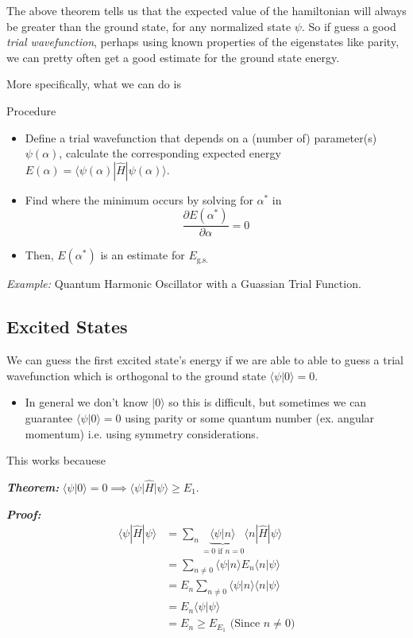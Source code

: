 \documentclass{article}
\newcommand{\ket}[1]{|#1 \rangle}
\newcommand{\inner}[2]{\langle #1 | #2 \rangle}
\begin{document}
\vskip 0.5cm
The above theorem tells us that the expected value of the hamiltonian will always be greater than the ground state, for any normalized state $\psi$. So if guess a good \emph{trial wavefunction}, perhaps using known properties of the eigenstates like parity, we can pretty often get a good estimate for the ground state energy. 

\vskip 0.5cm
More specifically, what we can do is 
\begin{mathdefinitionbox}{Procedure}
  \begin{itemize}
    \item Define a trial wavefunction that depends on a (number of) parameter(s) $\psi(\alpha)$, calculate the corresponding expected energy $E(\alpha) = \inner{\psi(\alpha)}{\hat{H}|\psi(\alpha)}$.
    \item Find where the minimum occurs by solving for $\alpha^*$ in 
    \[ \frac{\partial E(\alpha^*)}{\partial \alpha} = 0 \]
    \item Then, $E(\alpha^*)$ is an estimate for $E_{\text{g.s.}}$
  \end{itemize}
\end{mathdefinitionbox}

\vskip 0.5cm
\begin{dottedbox}
  \emph{Example:} Quantum Harmonic Oscillator with a Guassian Trial Function.
\end{dottedbox}


\vskip 1cm
\subsection{Excited States}
We can guess the first excited state's energy if we are able to able to guess a trial wavefunction which is orthogonal to the ground state $\inner{\psi}{0} = 0$.

\begin{itemize}
  \item In general we don't know $\ket{0}$ so this is difficult, but sometimes we can guarantee $\inner{\psi}{0} = 0$ using parity or some quantum number (ex. angular momentum) i.e. using symmetry considerations.
\end{itemize}

This works becauese 
\begin{dottedbox}
  \emph{\textbf{Theorem:}} $\inner{\psi}{0} = 0 \implies \inner{\psi}{\hat{H}|\psi} \geq E_1$.

  \vskip 0.5cm
  \textbf{\emph{Proof:}} 
  \begin{align*}
    \inner{\psi}{\hat{H}|\psi} &= \sum_{n} \underbrace{\inner{\psi}{n}}_{=0 \text{ if } n=0}\inner{n}{\hat{H}|\psi} \\
    &= \sum_{n \neq 0} \inner{\psi}{n} E_n \inner{n}{\psi} \\
    &= E_n \sum_{n \neq 0} \inner{\psi}{n} \inner{n}{\psi} \\
    &= E_n \inner{\psi}{\psi} \\
    &= E_n \geq E_{E_1} \text{  (Since $n \neq 0$)}
  \end{align*}
\end{dottedbox}
\end{document}
